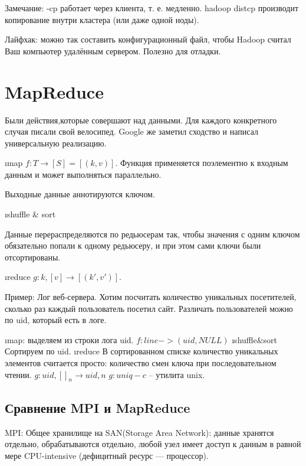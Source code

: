 Замечание: -cp работает через клиента, т. е. медленно. hadoop distcp производит копирование внутри кластера (или даже одной ноды). 

Лайфхак: можно так составить конфигурационный файл, чтобы Hadoop считал Ваш компьютер удалённым сервером. Полезно для отладки.

\section{MapReduce}
Были действия,которые совершают над данными. Для каждого конкретного случая писали свой велосипед. Google же заметил сходство и написал универсальную реализацию.

\begin{enumerate}
 \i map
  $f: T \rightarrow [S]=[(k, v)]$.
  Функция применяется поэлементно к входным данным и может выполняться параллельно.
  
  Выходные данные аннотируются ключом.

 \i shuffle \& sort
 
  Данные перераспределяются по редьюсерам так, чтобы значения с одним ключом обязательно попали к одному редьюсеру, и при этом сами ключи были отсортированы.
  
 \i reduce
  $g:k, [v] \rightarrow [(k', v')]$.
\end{enumerate}

Пример:
Лог веб-сервера. Хотим посчитать количество уникальных посетителей, сколько раз каждый пользователь посетил сайт. Различать пользователей можно по uid, который есть в логе. 
\begin{enumerate}
 \i map: выделяем из строки лога uid.
  $f: line->(uid, NULL)$
 \i shuffle\&sort
  Сортируем по uid. 
 \i reduce В сортированном списке количество уникальных элементов считается просто: количество смен ключа при последовательном чтении.
 $g: uid, []_n \rightarrow uid, n$
 $g: uniq -c$ --  утилита unix.
 
\end{enumerate}

\subsection{Сравнение MPI и MapReduce}
MPI: 
Общее хранилище на SAN(Storage Area Network): данные хранятся отдельно, обрабатываются отдельно, любой узел имеет доступ к данным в равной мере
CPU-intensive (дефицитный ресурс --- процессор).


